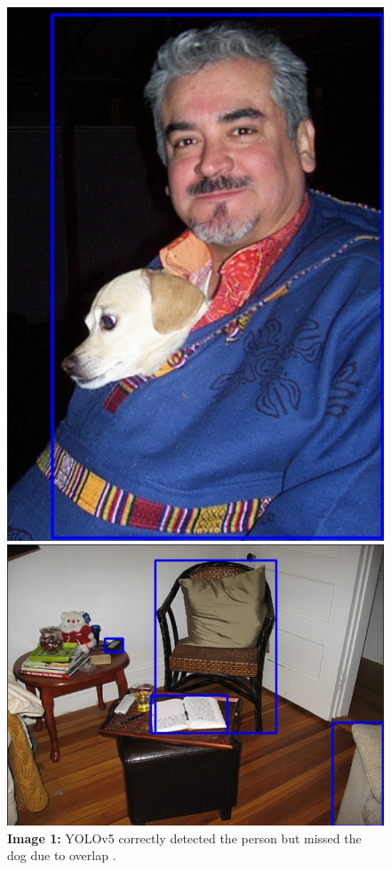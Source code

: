 \documentclass[12pt]{article}
\begin{document}
\begin{figure}[H]
    \centering
    \begin{minipage}[b]{0.45\textwidth}
        \includegraphics[width=\textwidth]{yolo_result1.png}
        \caption*{\textbf{Image 1:} YOLOv5 correctly detected the person but missed the dog due to overlap .}
    \end{minipage}
    \hfill
    \begin{minipage}[b]{0.45\textwidth}
        \includegraphics[width=\textwidth]{yolo_result2.png}

\end{minipage}
\end{figure}
\end{document}
